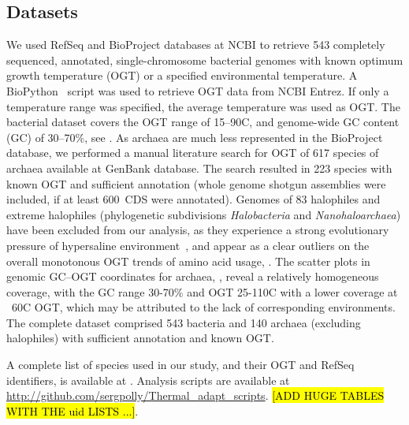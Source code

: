 \documentclass[10pt,letterpaper]{article}
\newcommand{\PROTEINLIMIT}{600}
\begin{document}
\subsection*{Datasets}
We used  RefSeq and BioProject databases at NCBI to retrieve 543 completely sequenced, annotated, single-chromosome bacterial genomes with known optimum growth temperature (OGT) or a specified environmental temperature. A BioPython~\cite{Cock2009Biopython} script was used to retrieve OGT data from NCBI Entrez. If only a temperature range was specified, the average temperature was used as OGT. The bacterial dataset covers the OGT range of 15--90\textdegree C, and genome-wide GC content (GC) of 30--70\%, see .
As archaea are much less represented in the BioProject database, we performed a manual literature search for OGT of 617 species of archaea available at GenBank database. The search resulted in 223 species with known OGT and sufficient annotation (whole genome shotgun assemblies were included, if at least \PROTEINLIMIT \ CDS were annotated). Genomes of 83 halophiles and extreme halophiles (phylogenetic subdivisions {\it Halobacteria} and {\it Nanohaloarchaea}) have been excluded from our analysis, as they experience a strong evolutionary pressure of hypersaline environment~\cite{Fukuchi2003Unique}, and appear as a clear outliers on the overall monotonous OGT trends of amino acid usage,  . The scatter plots in genomic GC--OGT coordinates for archaea, , reveal a relatively homogeneous coverage, with the GC range 30-70\% and OGT 25-110\textdegree C with a lower coverage at ~60\textdegree C OGT, which may be attributed to the lack of corresponding environments.  The complete dataset comprised 543 bacteria and 140 archaea (excluding halophiles) with sufficient annotation and known OGT.


A complete list of species used in our study, and their OGT and RefSeq identifiers, is available at . Analysis scripts are available at \url{http://github.com/sergpolly/Thermal_adapt_scripts}. \hl{[ADD HUGE TABLES WITH THE uid LISTS ...]}.
\end{document}
